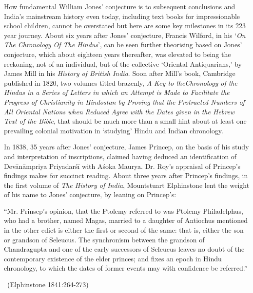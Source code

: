 How fundamental William Jones’ conjecture is to subsequent conclusions and India’s mainstream history even today, including text books for impressionable school children, cannot be overstated but here are some key milestones in its 223 year journey. About six years after Jones’ conjecture, Francis Wilford, in his ‘\textit{On The Chronology Of The Hindus}’, can be seen further theorising based on Jones’ conjecture, which about eighteen years thereafter, was elevated to being the reckoning, not of an individual, but of the collective ‘Oriental Antiquarians,’ by James Mill in his \textit{History of British India}. Soon after Mill’s book, Cambridge published in 1820, two volumes titled brazenly, \textit{A Key to the\break Chronology of the Hindus in a Series of Letters in which an Attempt is Made to Facilitate the Progress of Christianity in Hindostan by Proving that the Protracted Numbers of All Oriental Nations when Reduced Agree with the Dates given in the Hebrew Text of the Bible}, that should be much more than a small hint about at least one prevailing colonial motivation in ‘studying’ Hindu and Indian chronology.

In 1838, 35 years after Jones’ conjecture, James Princep, on the basis of his study and interpretation of inscriptions, claimed having deduced an identification of Devānāmpriya Priyadarśī with Aśoka Maurya. Dr. Roy’s appraisal of Princep’s findings makes for succinct reading. About three years after Princep’s findings, in the first volume of \textit{The History of India}, Mountstuart Elphinstone lent the weight of his name to Jones’ conjecture, by leaning on Princep’s:

\begin{myquote}
“Mr. Prinsep’s opinion, that the Ptolemy referred to was Ptolemy Philadelphus, who had a brother, named Magas, married to a daughter of Antiochus mentioned in the other edict is either the first or second of the same: that is, either the son or grandson of Seleucus. The synchronism between the grandson of Chandragupta and one of the early successors of Seleucus leaves no doubt of the contemporary existence of the elder princes; and fixes an epoch in Hindu chronology, to which the dates of former events may with confidence be referred.” 

~\hfill (Elphinstone 1841:264-273)
\end{myquote}

